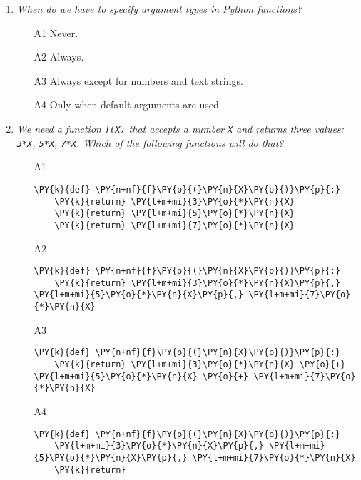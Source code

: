 \begin{enumerate}
\vspace{6mm}

\item {\em When do we have to specify argument types in Python functions?}\\

\begin{enumerate}
\item[A1] Never.
\item[A2] Always.
\item[A3] Always except for numbers and text strings.
\item[A4] Only when default arguments are used.
\end{enumerate}

\vspace{6mm}

\item {\em We need a function {\tt f(X)} that accepts a number {\tt X} and returns 
three values: {\tt 3*X}, {\tt 5*X}, {\tt 7*X}. Which of the following functions will do that?}\\

\begin{enumerate}
\item[A1] 
\begin{Verbatim}[commandchars=\\\{\}]
\PY{k}{def} \PY{n+nf}{f}\PY{p}{(}\PY{n}{X}\PY{p}{)}\PY{p}{:}
    \PY{k}{return} \PY{l+m+mi}{3}\PY{o}{*}\PY{n}{X} 
    \PY{k}{return} \PY{l+m+mi}{5}\PY{o}{*}\PY{n}{X} 
    \PY{k}{return} \PY{l+m+mi}{7}\PY{o}{*}\PY{n}{X}
\end{Verbatim}
\item[A2] 
\begin{Verbatim}[commandchars=\\\{\}]
\PY{k}{def} \PY{n+nf}{f}\PY{p}{(}\PY{n}{X}\PY{p}{)}\PY{p}{:}
    \PY{k}{return} \PY{l+m+mi}{3}\PY{o}{*}\PY{n}{X}\PY{p}{,} \PY{l+m+mi}{5}\PY{o}{*}\PY{n}{X}\PY{p}{,} \PY{l+m+mi}{7}\PY{o}{*}\PY{n}{X}
\end{Verbatim}
\item[A3] 
\begin{Verbatim}[commandchars=\\\{\}]
\PY{k}{def} \PY{n+nf}{f}\PY{p}{(}\PY{n}{X}\PY{p}{)}\PY{p}{:}
    \PY{k}{return} \PY{l+m+mi}{3}\PY{o}{*}\PY{n}{X} \PY{o}{+} \PY{l+m+mi}{5}\PY{o}{*}\PY{n}{X} \PY{o}{+} \PY{l+m+mi}{7}\PY{o}{*}\PY{n}{X}
\end{Verbatim}
\item[A4] 
\begin{Verbatim}[commandchars=\\\{\}]
\PY{k}{def} \PY{n+nf}{f}\PY{p}{(}\PY{n}{X}\PY{p}{)}\PY{p}{:}
    \PY{l+m+mi}{3}\PY{o}{*}\PY{n}{X}\PY{p}{,} \PY{l+m+mi}{5}\PY{o}{*}\PY{n}{X}\PY{p}{,} \PY{l+m+mi}{7}\PY{o}{*}\PY{n}{X}
    \PY{k}{return} 
\end{Verbatim}
\end{enumerate}


\end{enumerate}
